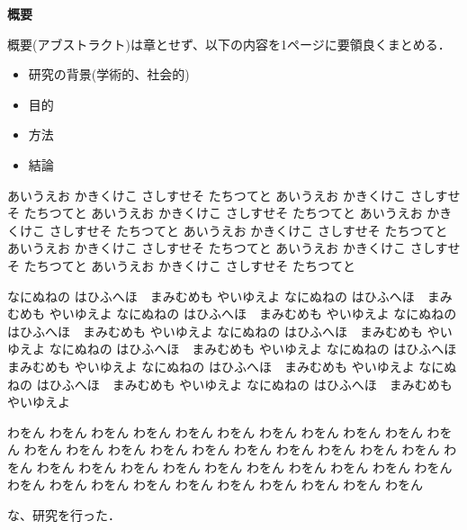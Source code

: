 \thispagestyle{empty}

\noindent
\begin{center}
\LARGE \bf 概要\\
\end{center}

\vspace{1.0cm} 
{\small
概要(アブストラクト)は章とせず、以下の内容を1ページに要領良くまとめる．

\begin{itemize}
\setlength{\itemsep}{-2mm}
\item 研究の背景(学術的、社会的)
\item 目的
\item 方法
\item 結論
\end{itemize}

あいうえお かきくけこ さしすせそ たちつてと
あいうえお かきくけこ さしすせそ たちつてと
あいうえお かきくけこ さしすせそ たちつてと
あいうえお かきくけこ さしすせそ たちつてと
あいうえお かきくけこ さしすせそ たちつてと
あいうえお かきくけこ さしすせそ たちつてと
あいうえお かきくけこ さしすせそ たちつてと
あいうえお かきくけこ さしすせそ たちつてと

なにぬねの はひふへほ　まみむめも やいゆえよ
なにぬねの はひふへほ　まみむめも やいゆえよ
なにぬねの はひふへほ　まみむめも やいゆえよ
なにぬねの はひふへほ　まみむめも やいゆえよ
なにぬねの はひふへほ　まみむめも やいゆえよ
なにぬねの はひふへほ　まみむめも やいゆえよ
なにぬねの はひふへほ　まみむめも やいゆえよ
なにぬねの はひふへほ　まみむめも やいゆえよ
なにぬねの はひふへほ　まみむめも やいゆえよ
なにぬねの はひふへほ　まみむめも やいゆえよ

わをん わをん わをん わをん わをん わをん わをん
わをん わをん わをん わをん わをん わをん わをん
わをん わをん わをん わをん わをん わをん わをん
わをん わをん わをん わをん わをん わをん わをん
わをん わをん わをん わをん わをん わをん わをん
わをん わをん わをん わをん わをん わをん わをん

な、研究を行った．
}
\normalsize
\newpage
